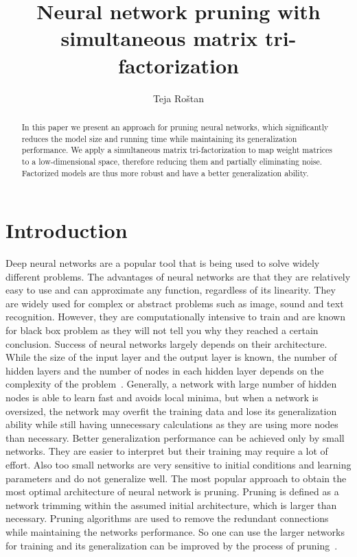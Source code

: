 \documentclass{article} %
\title{Neural network pruning with simultaneous matrix tri-factorization}
\author{Teja Ro\v{s}tan}
\begin{document}
\maketitle

\begin{abstract}

In this paper we present an approach for pruning neural networks, which
significantly reduces the model size and running time while maintaining its 
generalization performance. We apply a simultaneous matrix tri-factorization 
to map weight matrices to a low-dimensional space, therefore reducing them 
and partially eliminating noise. Factorized models are thus more robust and 
have a better generalization ability.

\end{abstract}

\section{Introduction}

Deep neural networks are a popular tool that is being used to solve widely
different problems. The advantages of neural networks are that they are
relatively easy to use and can approximate any function, regardless of its
linearity. They are widely used for complex or abstract problems such as image,
sound and text recognition. However, they are computationally intensive to
train and are known for black box problem as they will not tell you why they
reached a certain conclusion. Success of neural networks largely depends on
their architecture. While the size of the input layer and the output layer is
known, the number of hidden layers and the number of nodes in each hidden layer
depends on the complexity of the problem~\cite{augasta2013pruning}. Generally,
a network with large number of hidden nodes is able to learn fast and avoids
local minima, but when a network is oversized, the network may overfit the
training data and lose its generalization ability while still having
unnecessary calculations as they are using more nodes than necessary. Better
generalization performance can be achieved only by small networks. They are
easier to interpret but their training may require a lot of effort. Also too
small networks are very sensitive to initial conditions and learning parameters
and do not generalize well. The most popular approach to
obtain the most optimal architecture of neural network is pruning. Pruning is
defined as a network trimming within the assumed initial architecture, which is
larger than necessary. Pruning algorithms are used to remove the redundant
connections while maintaining the networks performance. So one can use the
larger networks for training and its generalization can be improved by the
process of pruning~\cite{augasta2013pruning}.
\end{document}
